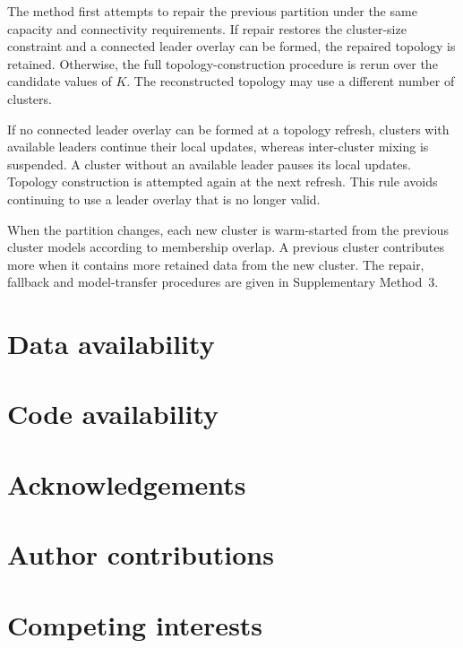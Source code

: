\documentclass[pdflatex,sn-mathphys-num]{sn-jnl}
\begin{document}
The method first attempts to repair the previous partition under the same capacity and connectivity requirements. If repair restores the cluster-size constraint and a connected leader overlay can be formed, the repaired topology is retained. Otherwise, the full topology-construction procedure is rerun over the candidate values of \(K\). The reconstructed topology may use a different number of clusters.

If no connected leader overlay can be formed at a topology refresh, clusters with available leaders continue their local updates, whereas inter-cluster mixing is suspended. A cluster without an available leader pauses its local updates. Topology construction is attempted again at the next refresh. This rule avoids continuing to use a leader overlay that is no longer valid.

When the partition changes, each new cluster is warm-started from the previous cluster models according to membership overlap. A previous cluster contributes more when it contains more retained data from the new cluster. The repair, fallback and model-transfer procedures are given in Supplementary Method~3.

















\section*{Data availability}

\section*{Code availability}

\section*{Acknowledgements}

\section*{Author contributions}

\section*{Competing interests}




\end{document}
